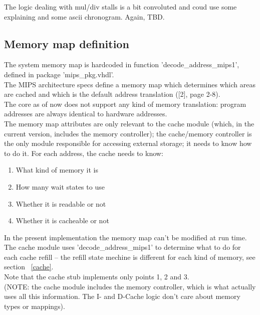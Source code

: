 \documentclass[11pt]{article}
\begin{document}
    The logic dealing with mul/div stalls is a bit convoluted and coud use some
    explaining and some ascii chronogram. Again, TBD.\\
    
    
\subsection{Memory map definition}
\label{memory_map_definition}

    The system memory map is hardcoded in function 'decode\_address\_mips1', 
    defined in package 'mips\_pkg.vhdl'.\\

    The MIPS architecture specs define a memory map which determines which areas
    are cached and which is the default address translation ([2], page 2-8).\\
    
    The core as of now does not support any kind of memory translation: program 
    addresses are always identical to hardware addresses.\\
    The memory map attributes are only relevant to the cache module (which, in
    the current version, includes the memory controller); the cache/memory controller 
    is the only module responsible for accessing external storage; it needs to 
    know how to do it. For each address, the cache needs to know:

\begin{enumerate}
    \item What kind of memory it is
    \item How many wait states to use
    \item Whether it is readable or not
    \item Whether it is cacheable or not
\end{enumerate}
        
    In the present implementation the memory map can't be modified at run time.\\
        
    The cache module uses 'decode\_address\_mips1' to determine what to do for 
    each cache refill -- the refill state mechine is different for each kind of 
    memory, see section ~\ref{cache}.\\
    
    Note that the cache stub implements only points 1, 2 and 3.\\

    (NOTE: the cache module includes the memory controller, which is what 
    actually uses all this information. The I- and D-Cache logic don't care
    about memory types or mappings).\\
\end{document}
